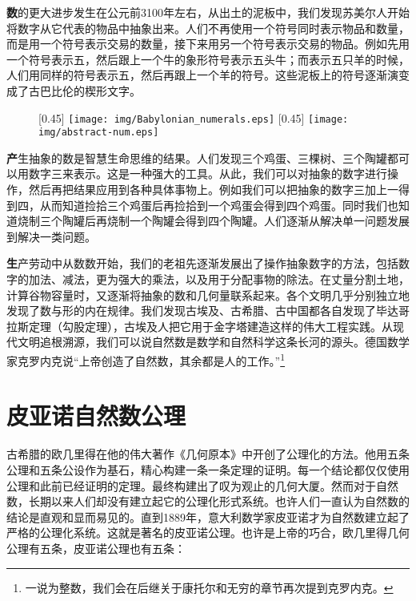 \documentclass[UTF8]{article}
\begin{document}
\textbf{数}的更大进步发生在公元前3100年左右，从出土的泥板中，我们发现苏美尔人开始将数字从它代表的物品中抽象出来。人们不再使用一个符号同时表示物品和数量，而是用一个符号表示交易的数量，接下来用另一个符号表示交易的物品。例如先用一个符号表示五，然后跟上一个牛的象形符号表示五头牛；而表示五只羊的时候，人们用同样的符号表示五，然后再跟上一个羊的符号。这些泥板上的符号逐渐演变成了古巴比伦的楔形文字。

\begin{figure}[htbp]
 \centering
 [0.45\linewidth]{
   \texttt{[image: img/Babylonian\_numerals.eps]}} \quad \quad
 [0.45\linewidth]{
   \texttt{[image: img/abstract-num.eps]}}
 \captionsetup{labelformat=empty}
 \label{fig:babylonian-num}
 \label{fig:abstract-num}
\end{figure}

\textbf{产}生抽象的数是智慧生命思维的结果。人们发现三个鸡蛋、三棵树、三个陶罐都可以用数字三来表示。这是一种强大的工具。从此，我们可以对抽象的数字进行操作，然后再把结果应用到各种具体事物上。例如我们可以把抽象的数字三加上一得到四，从而知道捡拾三个鸡蛋后再捡拾到一个鸡蛋会得到四个鸡蛋。同时我们也知道烧制三个陶罐后再烧制一个陶罐会得到四个陶罐。人们逐渐从解决单一问题发展到解决一类问题。


\textbf{生}产劳动中从数数开始，我们的老祖先逐渐发展出了操作抽象数字的方法，包括数字的加法、减法，更为强大的乘法，以及用于分配事物的除法。在丈量分割土地，计算谷物容量时，又逐渐将抽象的数和几何量联系起来。各个文明几乎分别独立地发现了数与形的内在规律。我们发现古埃及、古希腊、古中国都各自发现了毕达哥拉斯定理（勾股定理），古埃及人把它用于金字塔建造这样的伟大工程实践。从现代文明追根溯源，我们可以说自然数是数学和自然科学这条长河的源头。德国数学家克罗内克说“上帝创造了自然数，其余都是人的工作。”\footnote{一说为整数，我们会在后继关于康托尔和无穷的章节再次提到克罗内克。}


\section{皮亚诺自然数公理}

古希腊的欧几里得在他的伟大著作《几何原本》中开创了公理化的方法。他用五条公理和五条公设作为基石，精心构建一条一条定理的证明。每一个结论都仅仅使用公理和此前已经证明的定理。最终构建出了叹为观止的几何大厦。然而对于自然数，长期以来人们却没有建立起它的公理化形式系统。也许人们一直认为自然数的结论是直观和显而易见的。直到1889年，意大利数学家皮亚诺才为自然数建立起了严格的公理化系统。这就是著名的皮亚诺公理。也许是上帝的巧合，欧几里得几何公理有五条，皮亚诺公理也有五条：
\end{document}
